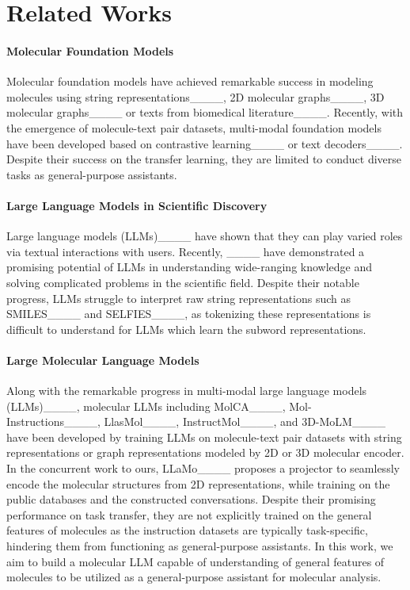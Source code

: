 \section{Related Works}
\vspace{-0.05in}
\paragraph{Molecular Foundation Models}
Molecular foundation models have achieved remarkable success in modeling molecules using string representations____, 2D molecular graphs____, 3D molecular graphs____ or texts from biomedical literature____. Recently, with the emergence of molecule-text pair datasets, multi-modal foundation models have been developed based on contrastive learning____ or text decoders____. Despite their success on the transfer learning, they are limited to conduct diverse tasks as general-purpose assistants.

\vspace{-0.05in}
\paragraph{Large Language Models in Scientific Discovery}
Large language models (LLMs)____ have shown that they can play varied roles via textual interactions with users. Recently, ____ have demonstrated a promising potential of LLMs in understanding wide-ranging knowledge and solving complicated problems in the scientific field. Despite their notable progress, LLMs struggle to interpret raw string representations such as SMILES____ and SELFIES____, as tokenizing these representations is difficult to understand for LLMs which learn the subword representations.

\vspace{-0.05in}
\paragraph{Large Molecular Language Models}
Along with the remarkable progress in multi-modal large language models (LLMs)____, molecular LLMs including MolCA____, Mol-Instructions____,  LlasMol____, InstructMol____, and 3D-MoLM____ have been developed by training LLMs on molecule-text pair datasets with string representations or graph representations modeled by 2D or 3D molecular encoder. In the concurrent work to ours, LLaMo____ proposes a projector to seamlessly encode the molecular structures from 2D representations, while training on the public databases and the constructed conversations. Despite their promising performance on task transfer, they are not explicitly trained on the general features of molecules as the instruction datasets are typically task-specific, hindering them from functioning as general-purpose assistants. In this work, we aim to build a molecular LLM capable of understanding of general features of molecules to be utilized as a general-purpose assistant for molecular analysis.